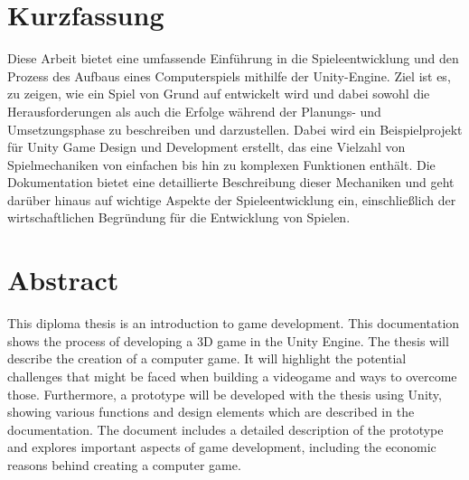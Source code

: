 \chapter*{Kurzfassung}

Diese Arbeit bietet eine umfassende Einführung in die Spieleentwicklung und den Prozess des Aufbaus eines Computerspiels mithilfe der Unity-Engine. Ziel ist es, zu zeigen, wie ein Spiel von Grund auf entwickelt wird und dabei sowohl die Herausforderungen als auch die Erfolge während der Planungs- und Umsetzungsphase zu beschreiben und darzustellen. Dabei wird ein Beispielprojekt für Unity Game Design und Development erstellt, das eine Vielzahl von Spielmechaniken von einfachen bis hin zu komplexen Funktionen enthält. Die Dokumentation bietet eine detaillierte Beschreibung dieser Mechaniken und geht darüber hinaus auf wichtige Aspekte der Spieleentwicklung ein, einschließlich der wirtschaftlichen Begründung für die Entwicklung von Spielen.

\chapter*{Abstract}

This diploma thesis is an introduction to game development. This documentation shows the process of developing a 3D game in the Unity Engine. The thesis will describe the creation of a computer game. It will highlight the potential challenges that might be faced when building a videogame and ways to overcome those. Furthermore, a prototype will be developed with the thesis using Unity, showing various functions and design elements which are described in the documentation. The document includes a detailed description of the prototype and explores important aspects of game development, including the economic reasons behind creating a computer game.